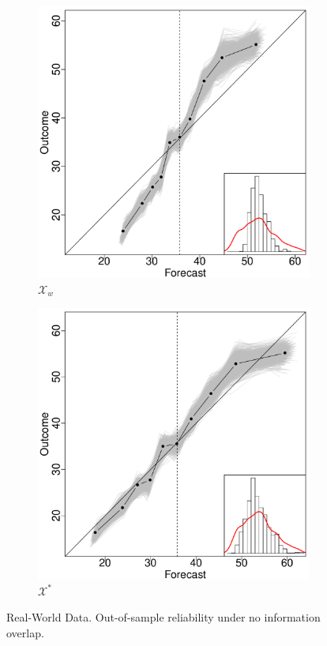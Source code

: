 \documentclass[11pt]{article}
\theoremstyle{definition}
\theoremstyle{definition}
\begin{document}
\begin{figure}[H]
\begin{subfigure}[b]{0.323\textwidth}
                \includegraphics[width=\textwidth]{IndependentOLP.pdf}
                \caption{$\mathcal{X}_w$}
                \label{fig:gull}
        \end{subfigure}%
         \begin{subfigure}[b]{0.323\textwidth}
                \includegraphics[width=\textwidth]{IndependentE-OLP.pdf}
                \caption{$\mathcal{X}^*$}
                \label{RelDiagramNoE}
             \end{subfigure}
          \caption{Real-World Data. Out-of-sample reliability under no information overlap. }
           \label{RelDiagramNo}
\end{figure}
\end{document}
